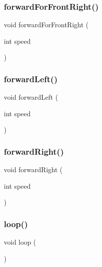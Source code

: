 \mbox{\label{car_8ino_a350b91f1aa7e8d8d431d1243f5de8ce2}} 
\subsubsection{\texorpdfstring{forward\+For\+Front\+Right()}{forwardForFrontRight()}}
{\footnotesize\ttfamily void forward\+For\+Front\+Right (\begin{DoxyParamCaption}\item[{int}]{speed }\end{DoxyParamCaption})}

\mbox{\label{car_8ino_a6bea6c9230620fc358ac2fe3cdc495ee}} 
\subsubsection{\texorpdfstring{forward\+Left()}{forwardLeft()}}
{\footnotesize\ttfamily void forward\+Left (\begin{DoxyParamCaption}\item[{int}]{speed }\end{DoxyParamCaption})}

\mbox{\label{car_8ino_aff9a5f1aef152d83f0f6aec7ff3a9c79}} 
\subsubsection{\texorpdfstring{forward\+Right()}{forwardRight()}}
{\footnotesize\ttfamily void forward\+Right (\begin{DoxyParamCaption}\item[{int}]{speed }\end{DoxyParamCaption})}

\mbox{\label{car_8ino_afe461d27b9c48d5921c00d521181f12f}} 
\subsubsection{\texorpdfstring{loop()}{loop()}}
{\footnotesize\ttfamily void loop (\begin{DoxyParamCaption}{ }\end{DoxyParamCaption})}

